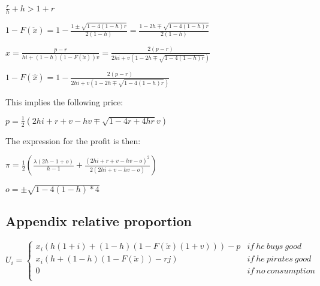 \documentclass{article}
\begin{document}
$\frac{r}{h}+h>1+r$

$1-F(\check{x})= 1-\frac{1 \pm \sqrt{1-4(1-h)r}}{2(1-h)}=\frac{1-2h \mp \sqrt{1-4(1-h)r}}{2(1-h)}$ 

$\hat{x}=\frac{p-r}{hi+(1-h)(1-F(\check{x}))v}=\frac{2(p-r)}{2hi+v(1-2h \mp \sqrt{1-4(1-h)r})}$

$1-F(\hat{x})=1-\frac{2(p-r)}{2hi+v(1-2h \mp \sqrt{1-4(1-h)r})}$

This implies the following price:

$p = \frac{1}{2}(2hi+r+v-hv \mp \sqrt{1-4r+4hr} v)$

The expression for the profit is then: 

$\pi = \frac{1}{2}\left( \frac{\lambda(2h-1 + o)}{h-1} + \frac{(2hi+r+v-hv-o)^2}{2(2hi+v-hv-o)} \right)$

$o = \pm \sqrt{1-4(1-h)*4}$ 

\subsection{Appendix relative proportion}

\[
U_i= \left\{
                \begin{array}{ll}
                  x_i(h(1+i)+(1-h)(1-F(\check{x})(1+v)))-p  & if ~ he ~ buys ~ good  \\
                  x_i(h+(1-h)(1-F(\check{x}))-rj) &  if ~ he ~ pirates ~ good \\
									0 & if ~ no ~ consumption  \\ 
                \end{array}
\right.
\]
\end{document}
